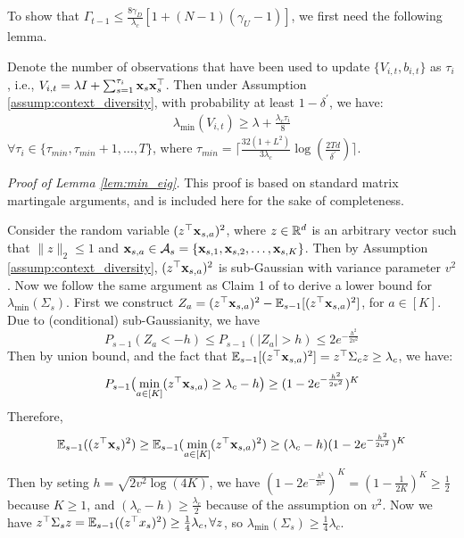 To show that $\Gamma_{t-1} \leq \frac{8 \gamma_{D}}{\lambda_{c}} [1+(N-1)(\gamma_{U}-1)]$, we first need the following lemma.

\begin{lemma} \label{lem:min_eig}
Denote the number of observations that have been used to update $\{V_{i,t}, b_{i,t}\}$ as $\tau_{i}$, i.e., $V_{i,t}=\lambda I + \sum_{s=1}^{\tau_{i}}\mathbf{x}_{s} \mathbf{x}_{s}^{\top}$.
Then under Assumption \ref{assump:context_diversity}, with probability at least $1-\delta^{'}$, we have:
\begin{align*}
    \lambda_{\min}(V_{i,t}) \geq \lambda + \frac{\lambda_{c} \tau_{i}}{8}
\end{align*}
$\forall \tau_{i} \in\{\tau_{min},\tau_{min}+1,\dots,T\}$, where $\tau_{min}=\lceil \frac{32(1+L^{2})}{3 \lambda_{c}}\log(\frac{2Td}{\delta^{\prime}}) \rceil$.
\end{lemma}

\noindent \textit{Proof of Lemma \ref{lem:min_eig}.}
This proof is based on standard matrix martingale arguments, and is included here for the sake of completeness. 

Consider the random variable $(z^{\top} \mathbf{x}_{s,a})^{2}$, where $z \in \mathbb{R}^{d}$ is an arbitrary vector such that $\lVert z \rVert_{2}\leq 1$ and $\mathbf{x}_{s,a} \in \mathcal{A}_{s}=\{\mathbf{x}_{s,1}, \mathbf{x}_{s,2}, \dots, \mathbf{x}_{s,K}\}$. 
Then by Assumption \ref{assump:context_diversity}, $(z^{\top} \mathbf{x}_{s,a})^{2}$ is sub-Gaussian with variance parameter $v^{2}$. Now we follow the same argument as Claim 1 of \citet{gentile2014online} to derive a lower bound for $\lambda_{\min}(\Sigma_{s})$. First we construct $Z_{a}=(z^{\top} \mathbf{x}_{s,a})^{2}-\mathbb{E}_{s-1}[(z^{\top} \mathbf{x}_{s,a})^{2}]$, for $a \in [K]$. Due to (conditional) sub-Gaussianity, we have
$$P_{s-1}(Z_{a} < -h) \leq P_{s-1}(|Z_{a}| > h) \leq 2e^{-\frac{h^{2}}{2v^{2}}}$$
Then by union bound, and the fact that $\mathbb{E}_{s-1}[(z^{\top} \mathbf{x}_{s,a})^{2}]= z^{\top}\Sigma_{c}z \geq \lambda_{c}$, we have:
$$P_{s-1}\bigl( \min_{a\in[K]} (z^{\top} \mathbf{x}_{s,a}) \geq \lambda_{c} - h \bigr) \geq (1-2e^{-\frac{h^{2}}{2v^{2}}})^{K}$$
Therefore,
$$\mathbb{E}_{s-1}((z^{\top} \mathbf{x}_{s})^{2}) \geq \mathbb{E}_{s-1}(\min_{a\in[K]}(z^{\top} \mathbf{x}_{s,a})^{2}) \geq (\lambda_{c}-h) (1-2e^{-\frac{h^{2}}{2v^{2}}})^{K}$$
Then by seting $h=\sqrt{2 v^{2}\log{(4K)}}$, we have $(1-2e^{-\frac{h^{2}}{2v^{2}}})^{K} = (1-\frac{1}{2K})^{K} \geq \frac{1}{2}$ because $K \geq 1$, and $(\lambda_{c}-h)\geq \frac{\lambda_{c}}{2}$ because of the assumption on $v^{2}$. Now we have $z^{\top} \Sigma_{s} z = \mathbb{E}_{s-1}((z^{\top} x_{s})^{2}) \geq \frac{1}{4}\lambda_{c},\forall z$, so $\lambda_{\min}(\Sigma_{s}) \geq \frac{1}{4}\lambda_{c}$.

